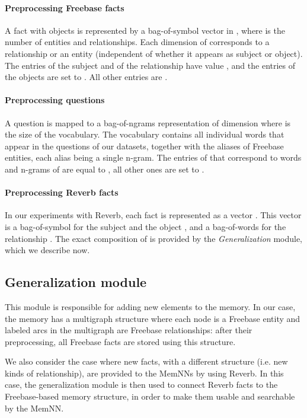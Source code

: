 \documentclass[11pt,a4paper]{article}
\newcommand{\fb}{{\sf Freebase}\xspace}
\newcommand{\rv}{{\sf Reverb}\xspace}
\begin{document}
\paragraph{Preprocessing Freebase facts}
A fact with  objects  is represented by a bag-of-symbol vector 
in , where  is the number of entities and
relationships. Each dimension of  corresponds
to a relationship or an entity (independent of whether it appears as
subject or object). The entries of the subject and of the
relationship have value , and the entries of the objects are set to
. All other entries are .

\paragraph{Preprocessing questions}
A question  is mapped to a bag-of-ngrams representation
 of dimension  where  is the size of the
vocabulary. The vocabulary contains all individual words that appear
in the questions of our datasets, together with the aliases of \fb
entities, each alias being a single n-gram. The entries of
 that correspond to words and n-grams of  are
equal to , all other ones are set to .



\paragraph{Preprocessing Reverb facts}
In our experiments with \rv, each fact 
is represented as a vector . This vector is a
bag-of-symbol for the subject  and the object , and a
bag-of-words for the relationship . The exact composition of 
is
provided by the {\it Generalization} module, which we describe now.


\subsection{Generalization module}

This module is responsible for adding new elements to the memory. In
our case, the memory has a multigraph structure where each node is a
\fb entity and labeled arcs in the multigraph are \fb relationships:
after their preprocessing, all \fb facts are stored using this structure.

We also consider the case where new facts, with a different structure
(i.e. new kinds of relationship), are provided to the MemNNs by using
\rv.
In this case, the generalization module is then used to connect \rv
facts to the \fb-based memory structure, in order to make them usable
and searchable by the MemNN.
\end{document}
